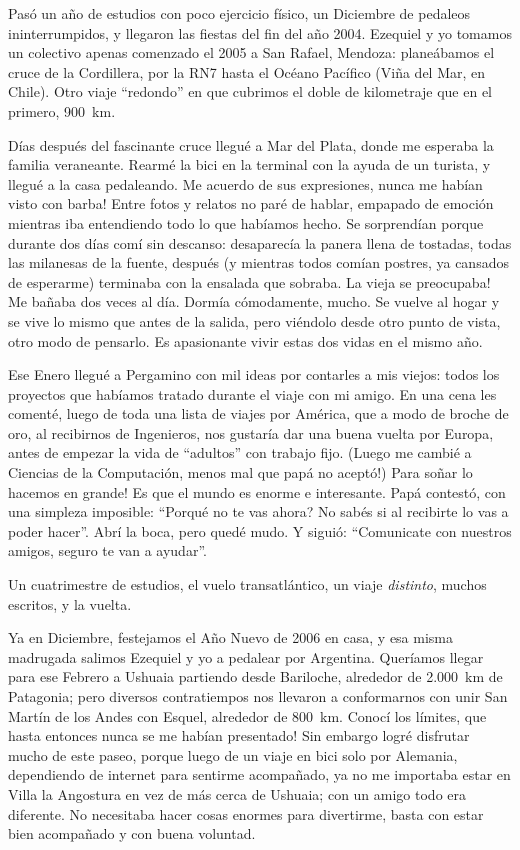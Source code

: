 \documentclass[11pt]{book}
\begin{document}
Pas\'o un a\~no de estudios con poco ejercicio f\'isico, un Diciembre de
pedaleos ininterrumpidos, y llegaron las fiestas del fin del a\~no 2004.
Ezequiel y yo tomamos un colectivo apenas comenzado el 2005 a San Rafael,
Mendoza: plane\'abamos el cruce de la Cordillera, por la {\small RN}7 hasta el
Oc\'eano Pac\'ifico (Vi\~na del Mar, en Chile). Otro viaje ``redondo'' en que
cubrimos el doble de kilometraje que en el primero, 900~km.

D\'ias despu\'es del fascinante cruce llegu\'e a Mar del Plata, donde me
esperaba la familia veraneante. Rearm\'e la bici en la terminal con la ayuda
de un turista, y llegu\'e a la casa pedaleando. Me acuerdo de sus expresiones,
\textexclamdown nunca me hab\'ian visto con barba! Entre fotos y relatos no
par\'e de hablar, empapado de emoci\'on mientras iba entendiendo todo lo que
hab\'iamos hecho. Se sorprend\'ian porque durante dos d\'ias com\'i sin
descanso: desaparec\'ia la panera llena de tostadas, todas las milanesas de la
fuente, despu\'es (y mientras todos com\'ian postres, ya cansados de esperarme)
terminaba con la ensalada que sobraba. \textexclamdown La vieja se preocupaba!
Me ba\~naba dos veces al d\'ia. Dorm\'ia c\'omodamente, mucho. Se vuelve al
hogar y se vive lo mismo que antes de la salida, pero vi\'endolo desde otro
punto de vista, otro modo de pensarlo. Es apasionante vivir estas dos vidas en
el mismo a\~no.

Ese Enero llegu\'e a Pergamino con mil ideas por contarles a mis viejos: todos
los proyectos que hab\'iamos tratado durante el viaje con mi amigo. En una cena
les coment\'e, luego de toda una lista de viajes por Am\'erica, que a modo de
broche de oro, al recibirnos de Ingenieros, nos gustar\'ia dar una buena vuelta
por Europa, antes de empezar la vida de ``adultos'' con trabajo fijo. (Luego me
cambi\'e a Ciencias de la Computaci\'on, \textexclamdown menos mal que pap\'a no
acept\'o!) \textexclamdown Para so\~nar lo hacemos en grande! Es que el mundo es
enorme e interesante. Pap\'a contest\'o, con una simpleza imposible:
``\textquestiondown Porqu\'e no te vas ahora? No sab\'es si al recibirte lo vas
a poder hacer''. Abr\'i la boca, pero qued\'e mudo. Y sigui\'o: ``Comunicate con
nuestros amigos, seguro te van a ayudar''.

Un cuatrimestre de estudios, el vuelo transatl\'antico, un viaje
\emph{distinto}, muchos escritos, y la vuelta.

Ya en Diciembre, festejamos el A\~no Nuevo de 2006 en casa, y esa misma
madrugada salimos Ezequiel y yo a pedalear por Argentina. Quer\'iamos llegar
para ese Febrero a Ushuaia partiendo desde Bariloche, alrededor de 2.000~km de
Patagonia; pero diversos contratiempos nos llevaron a conformarnos con unir San
Mart\'in de los Andes con Esquel, alrededor de 800~km. \textexclamdown Conoc\'i
los l\'imites, que hasta entonces nunca se me hab\'ian presentado! Sin embargo
logr\'e disfrutar mucho de este paseo, porque luego de un viaje en bici solo por
Alemania, dependiendo de internet para sentirme acompa\~nado, ya no me importaba
estar en Villa la Angostura en vez de m\'as cerca de Ushuaia; con un amigo todo
era diferente. No necesitaba hacer cosas enormes para divertirme, basta con
estar bien acompa\~nado y con buena voluntad.
\end{document}
